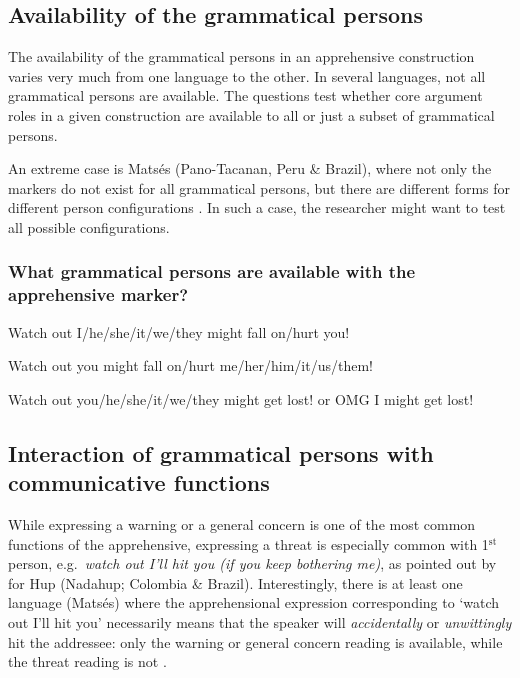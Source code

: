 \documentclass[output=paper,colorlinks,citecolor=brown]{langscibook}
\begin{document}
\subsection{Availability of the grammatical persons}
\label{subsec:apprgrammaticalpersons}

The availability of the grammatical persons in an apprehensive construction varies very much from one language to the other. In several languages, not all grammatical persons are available. The questions test whether core argument roles in a given construction are available to all or just a subset of grammatical persons.

An extreme case is Matsés (Pano-Tacanan, Peru \& Brazil), where not only the markers do not exist for all grammatical persons, but there are different forms for different person configurations \citep[439ff]{fleck2003}. In such a case, the researcher might want to test all possible configurations.

\subsubsection{What grammatical persons are available with the apprehensive marker?}
\label{1.3.1}

\ea \label{p13} {\op}Watch out{\cp} I\textnormal{/}he\textnormal{/}she\textnormal{/}it\textnormal{/}we\textnormal{/}they might fall on\textnormal{/}hurt you!
\z

\ea \label{p14} {\op}Watch out{\cp} you might fall on\textnormal{/}hurt me\textnormal{/}her\textnormal{/}him\textnormal{/}it\textnormal{/}us\textnormal{/}them!
\z

\ea \label{p15} {\op}Watch out{\cp} you\textnormal{/}he\textnormal{/}she\textnormal{/}it\textnormal{/}we\textnormal{/}they might get lost! \textnormal{or} {\op}OMG{\cp} I might get lost!
\z


\subsection{Interaction of grammatical persons with communicative functions}
\label{subsec:apprinteraction}

While expressing a warning or a general concern is one of the most common functions of the apprehensive, expressing a threat is especially common with 1$\mathrm{^{st}}$ person, e.g.\ \textit{watch out I'll hit you (if you keep bothering me)}, as pointed out by \citet[631]{epps2008} for Hup (Nadahup; Colombia \& Brazil). Interestingly, there is at least one language (Matsés) where the apprehensional expression corresponding to `watch out I'll hit you' necessarily means that the speaker will \textit{accidentally} or \textit{unwittingly} hit the addressee: only the warning or general concern reading is available, while the threat reading is not \citep[439; p.c.\ 2014]{fleck2003}.
\end{document}
